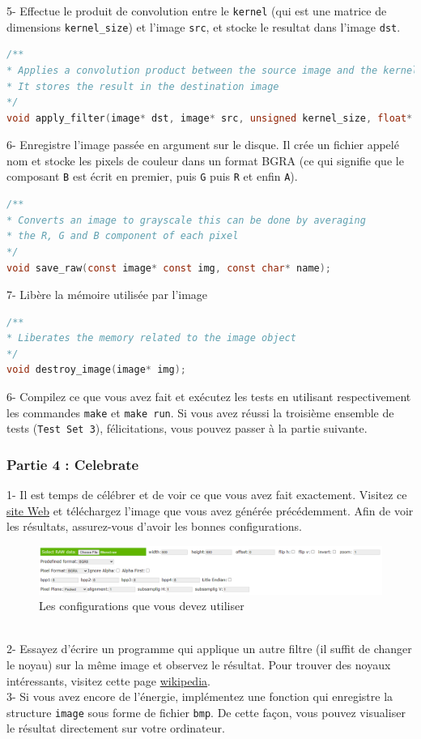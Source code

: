 \documentclass[a4paper]{article}
\begin{document}
	5- Effectue le produit de convolution entre le \texttt{kernel} (qui est une matrice de dimensions \texttt{kernel\_size}) et l'image \texttt{src}, et stocke le resultat dans l'image \texttt{dst}.
	\begin{lstlisting}[language=C]
/**
* Applies a convolution product between the source image and the kernel
* It stores the result in the destination image 
*/
void apply_filter(image* dst, image* src, unsigned kernel_size, float* kernel);
	\end{lstlisting}

	6- Enregistre l'image passée en argument sur le disque. Il crée un fichier appelé nom et stocke les pixels de couleur dans un format BGRA (ce qui signifie que le composant \texttt{B} est écrit en premier, puis \texttt{G} puis \texttt{R} et enfin \texttt{A}).
	\begin{lstlisting}[language=C]
/**
* Converts an image to grayscale this can be done by averaging
* the R, G and B component of each pixel
*/
void save_raw(const image* const img, const char* name);
	\end{lstlisting}
	
	7- Libère la mémoire utilisée par l'image
	\begin{lstlisting}[language=C]
/**
* Liberates the memory related to the image object
*/ 
void destroy_image(image* img);
	\end{lstlisting}
	6- Compilez ce que vous avez fait et exécutez les tests en utilisant respectivement les commandes \texttt{make} et \texttt{make run}. Si vous avez réussi la troisième ensemble de tests (\texttt{Test Set 3}), félicitations, vous pouvez passer à la partie suivante.
	
	\subsubsection*{Partie 4 : Celebrate}
	1- Il est temps de célébrer et de voir ce que vous avez fait exactement. Visitez ce \href{https://rawpixels.net/}{site Web} et téléchargez l'image que vous avez générée précédemment. Afin de voir les résultats, assurez-vous d'avoir les bonnes configurations.
	\begin{figure}[!h]
		\centering
		\includegraphics[width=170mm]{resources/raw_pixel_config}
		\caption{Les configurations que vous devez utiliser}
	\end{figure}\\
	2- Essayez d'écrire un programme qui applique un autre filtre (il suffit de changer le noyau) sur la même image et observez le résultat. 
	Pour trouver des noyaux intéressants, visitez cette page \href{https://en.wikipedia.org/wiki/Kernel_(image_processing)}{wikipedia}.\\
	3- Si vous avez encore de l'énergie, implémentez une fonction qui enregistre la structure \texttt{image} sous forme de fichier \texttt{bmp}. De cette façon, vous pouvez visualiser le résultat directement sur votre ordinateur.
	
\end{document}
